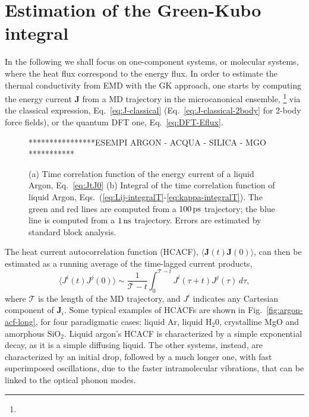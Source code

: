 \section{Estimation of the Green-Kubo integral} \label{sec:data-analysis-methods}

In the following we shall focus on one-component systems, or molecular systems, where the heat flux correspond to the energy flux. 
In order to estimate the thermal conductivity from EMD with the GK approach, one starts by computing the energy current $\mathbf{J}$ from a MD trajectory in the microcanonical ensemble,
\footnote{} 
via the classical expression, Eq.~\eqref{eq:J-classical} (Eq.~\eqref{eq:J-classical-2body} for 2-body force fields), or the quantum DFT one, Eq.~\eqref{eq:DFT-Eflux}.

\begin{figure}
    \begin{center}
    ****************ESEMPI ARGON - ACQUA - SILICA - MGO ***********
    \end{center}
	\caption{(a) Time correlation function of the energy current of a liquid Argon, Eq.~\eqref{eq:JtJ0}
    (b) Integral of the time correlation function of liquid Argon, Eqs.~(\ref{eq:Lij-integralT}-\ref{eq:kappa-integralT}).
    The green and red lines are computed from a $100\,\mathrm{ps}$ trajectory; the blue line is computed from a $1\,\mathrm{ns}$ trajectory.
    Errors are estimated by standard block analysis.} \label{fig:acf-examples}
\end{figure}

The heat current autocorrelation function (HCACF), $\langle\mathbf{J}(t)\mathbf{J}(0)\rangle$, can then be estimated as a running average of the time-lagged current products, 
\begin{equation}
    \langle J^i(t) J^j(0)\rangle \sim \frac{1}{\mathcal{T}-t} \int_0^{\mathcal{T}-t} J^i(\tau+t) J^j(\tau) \, d\tau , \label{eq:JtJ0}
\end{equation}
where $\mathcal{T}$ is the length of the MD trajectory, and $J^i$ indicates any Cartesian component of $\mathbf{J}_i$.
Some typical examples of HCACFs are shown in Fig.~\ref{fig:argon-acf-long}, for four paradigmatic cases: liquid Ar, liquid H$_2$0, crystalline MgO and amorphous SiO$_2$. Liquid argon's HCACF is characterized by a simple exponential decay, as it is a simple diffusing liquid. The other systems, instead, are characterized by an initial drop, followed by a much longer one, with fast superimposed oscillations, due to the faster intramolecular vibrations, that can be linked to the optical phonon modes.

